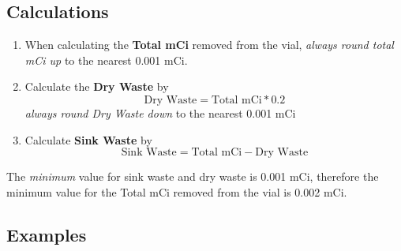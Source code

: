 \documentclass[12pt, letterpaper]{article}
\begin{document}
\subsection{Calculations}
\begin{enumerate}
    \item When calculating the \textbf{Total mCi} removed from the vial, \emph{always round total mCi up} to the nearest 0.001 mCi.
    \item Calculate the \textbf{Dry Waste} by
    \[ \text{Dry Waste} = \text{Total mCi} * 0.2 \]
    \emph{always round Dry Waste down} to the nearest 0.001 mCi
    \item Calculate \textbf{Sink Waste} by
    \[ \text{Sink Waste} = \text{Total mCi} - \text{Dry Waste} \]
\end{enumerate}

The \emph{minimum} value for sink waste and dry waste is 0.001 mCi, therefore the minimum value for the Total mCi removed from the vial is 0.002 mCi.

\subsection{Examples}
\end{document}

